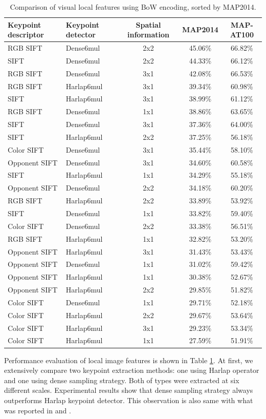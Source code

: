 \documentclass[twocolumn]{bmcart}%
\begin{document}
\begin{table}
	\centering
	\caption{Comparison of visual local features using BoW encoding, sorted by MAP2014.}
	\begin{tabular}{llccc}
		\hline
		Keypoint descriptor & Keypoint detector & Spatial information & MAP2014 & MAP-AT100 \\ \hline
		RGB SIFT & Dense6mul & 2x2   & 45.06\% & 66.82\% \\
		SIFT  & Dense6mul & 2x2   & 44.33\% & 66.12\% \\
		RGB SIFT & Dense6mul & 3x1   & 42.08\% & 66.53\% \\
		RGB SIFT & Harlap6mul & 3x1   & 39.34\% & 60.98\% \\
		SIFT  & Harlap6mul & 3x1   & 38.99\% & 61.12\% \\
		RGB SIFT & Dense6mul & 1x1   & 38.86\% & 63.65\% \\
		SIFT  & Dense6mul & 3x1   & 37.36\% & 64.00\% \\
		SIFT  & Harlap6mul & 2x2   & 37.25\% & 56.18\% \\
		Color SIFT & Dense6mul & 3x1   & 35.44\% & 58.10\% \\
		Opponent SIFT & Dense6mul & 3x1   & 34.60\% & 60.58\% \\
		SIFT  & Harlap6mul & 1x1   & 34.29\% & 55.18\% \\
		Opponent SIFT & Dense6mul & 2x2   & 34.18\% & 60.20\% \\
		RGB SIFT & Harlap6mul & 2x2   & 33.89\% & 53.92\% \\
		SIFT  & Dense6mul & 1x1   & 33.82\% & 59.40\% \\
		Color SIFT & Dense6mul & 2x2   & 33.38\% & 56.51\% \\
		RGB SIFT & Harlap6mul & 1x1   & 32.82\% & 53.20\% \\
		Opponent SIFT & Harlap6mul & 3x1   & 31.43\% & 53.43\% \\
		Opponent SIFT & Dense6mul & 1x1   & 31.02\% & 59.42\% \\
		Opponent SIFT & Harlap6mul & 1x1   & 30.38\% & 52.67\% \\
		Opponent SIFT & Harlap6mul & 2x2   & 29.85\% & 51.82\% \\
		Color SIFT & Dense6mul & 1x1   & 29.71\% & 52.18\% \\
		Color SIFT & Harlap6mul & 2x2   & 29.67\% & 53.64\% \\
		Color SIFT & Harlap6mul & 3x1   & 29.23\% & 53.34\% \\
		Color SIFT & Harlap6mul & 1x1   & 27.59\% & 51.91\% \\ \hline
	\end{tabular}%
	\label{tab:local}%
\end{table}%
Performance evaluation of local image features is shown in Table \ref{tab:local}. At first, we extensively compare two keypoint extraction methods: one using Harlap operator and one using dense sampling strategy. Both of types were extracted at six different scales. Experimental results show that dense sampling strategy always outperforms Harlap keypoint detector. This observation is also same with what was reported in \cite{bosch2006scene} and \cite{bosch2007image}.
\end{document}
